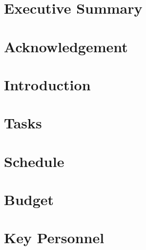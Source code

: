 \documentclass{article}
\begin{document}


\newpage
\tableofcontents

\section{Executive Summary}


\section{Acknowledgement}


\section{Introduction}














\section{Tasks}

\section{Schedule}

\section{Budget}


\section{Key Personnel}


\newpage

\end{document}
